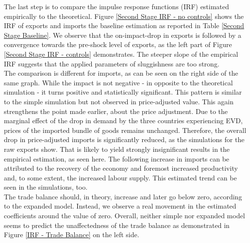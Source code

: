 \documentclass{article}
\begin{document}
The last step is to compare the impulse response functions (IRF) estimated empirically to the theoretical. Figure \ref{Second Stage IRF - no controls} shows the IRF of exports and imports the baseline estimation as reported in Table \ref{Second Stage Baseline}. We observe that the on-impact-drop in exports is followed by a convergence towards the pre-shock level of exports, as the left part of Figure \ref{Second Stage IRF - controls} demonstrates. The steeper slope of the empirical IRF suggests that the applied parameters of sluggishness are too strong. \\
The comparison is different for imports, as can be seen on the right side of the same graph. While the impact is not negative - in opposite to the theoretical simulation - it turns positive and statistically significant. This pattern is similar to the simple simulation but not observed in price-adjusted value. This again strengthens the point made earlier, about the price adjustment. Due to the marginal effect of the drop in demand by the three countries experiencing EVD, prices of the imported bundle of goods remains unchanged. Therefore, the overall drop in price-adjusted imports is significantly reduced, as the simulations for the raw exports show. That is likely to yield strongly insignificant results in the empirical estimation, as seen here. The following increase in imports can be attributed to the recovery of the economy and foremost increased productivity and, to some extent, the increased labour supply. This estimated trend can be seen in the simulations, too.\\
The trade balance should, in theory, increase and later go below zero, according to the expanded model. Instead, we observe a real movement in the estimated coefficients around the value of zero. Overall, neither simple nor expanded model seems to predict the unaffectedness of the trade balance as demonstrated in Figure \ref{IRF - Trade Balance} on the left side.
\end{document}
